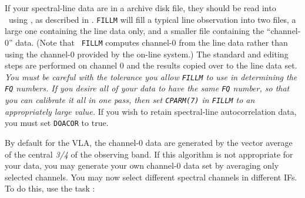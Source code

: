      If your spectral-line data are in a  archive disk file,
they should be read into \AIPS\ using {\tt {}}, as described
in .  {\tt FILLM} will fill a typical line observation
into two files, a large one containing the line data only, and a
smaller file containing the ``channel-0'' data.  (Note that {\tt
  FILLM} computes channel-0 from the line data rather than using the
channel-0 provided by the on-line system.)  The standard
 and editing steps are performed on channel 0 and
the results copied over to the line data set.  {\it You must be
  careful with the tolerance you   allow {\tt FILLM} to use in
  determining the {\tt FQ} numbers.  If   you desire all of your data
  to have the same {\tt FQ} number, so   that you can calibrate it all
  in one pass, then set {\tt CPARM(7)}   in {\tt FILLM} to an
  appropriately large value.}  If you wish to retain spectral-line
autocorrelation data, you must set {\tt DOACOR} to true.

     By default for the VLA, the channel-0 data are generated by the
vector average of the central {\it 3/4\/} of the observing band.  If
this algorithm is not appropriate for your data, you may generate your
own channel-0 data set by averaging only selected channels.  You may
now select different spectral channels in different IFs.  To do this,
use the task {\tt {}}:


